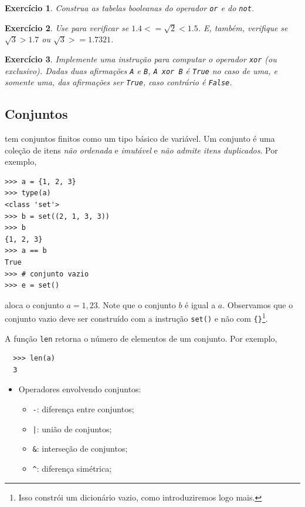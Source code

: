 \documentclass[12pt]{article}
\newtheorem{exr}{Exercício}[section]
\begin{document}
\begin{exr}
  Construa as tabelas booleanas do operador \lstinline+or+ e do \lstinline+not+.
\end{exr}

\begin{exr}
  Use {\python} para verificar se $1.4 <= \sqrt{2} < 1.5$. E, também, verifique se $\sqrt{3} > 1.7$ ou $\sqrt{3} >= 1.7321$.
\end{exr}

\begin{exr}
  Implemente uma instrução para computar o operador \lstinline+xor+ (ou exclusivo). Dadas duas afirmações \lstinline+A+ e \lstinline+B+, \lstinline+A xor B+ é \lstinline+True+ no caso de uma, e somente uma, das afirmações ser \lstinline+True+, caso contrário é \lstinline+False+.
\end{exr}


\subsection{Conjuntos}

{\python} tem conjuntos finitos como um tipo básico de variável. Um conjunto é uma coleção de itens \emph{não ordenada} e \emph{imutável} e \emph{não admite itens duplicados}. Por exemplo,
\begin{lstlisting}
>>> a = {1, 2, 3}
>>> type(a)
<class 'set'>
>>> b = set((2, 1, 3, 3))
>>> b
{1, 2, 3}
>>> a == b
True
>>> # conjunto vazio
>>> e = set()
\end{lstlisting}
aloca o conjunto $a = {1,2 3}$. Note que o conjunto $b$ é igual a $a$. Observamos que o conjunto vazio deve ser construído com a instrução \lstinline+set()+ e não com \lstinline+{}+\footnote{Isso constrói um dicionário vazio, como introduziremos logo mais.}.

\begin{obs}
  A função {\python} \lstinline+len+ retorna o número de elementos de um conjunto. Por exemplo,
  \begin{lstlisting}
  >>> len(a)
  3
  \end{lstlisting}
\end{obs}

\begin{itemize}
\item Operadores envolvendo conjuntos:
  \begin{itemize}
  \item[] \lstinline+-+: diferença entre conjuntos;
  \item[] \lstinline+|+: união de conjuntos;
  \item[] \lstinline+&+: interseção de conjuntos;
  \item[] \lstinline+^+: diferença simétrica;
  \end{itemize}
\end{itemize}
\end{document}
